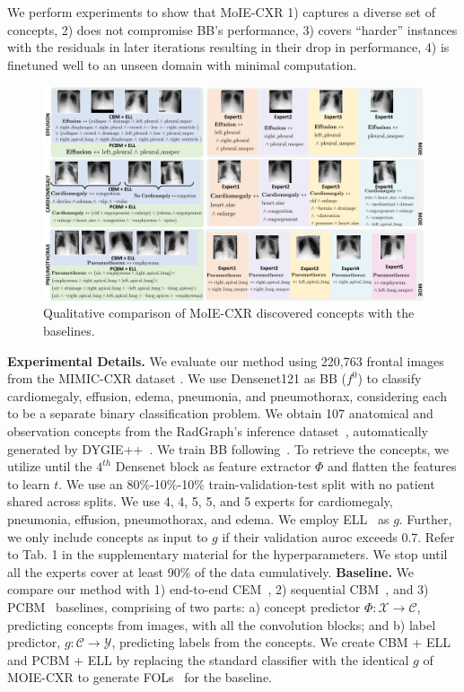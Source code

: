 We perform experiments to show that MoIE-CXR 1) captures a diverse set of concepts, 2) does not compromise BB's performance, 3) covers ``harder'' instances with the residuals in later iterations resulting in their drop in performance, 4) is finetuned well to an unseen domain with minimal computation. 

\begin{figure}[ht]
\begin{center}
\includegraphics[width=\linewidth]{plots/main/Qual_main_up.pdf}
\caption{Qualitative comparison of MoIE-CXR discovered concepts with the baselines.}
\label{fig:qual}
\end{center}
\end{figure}

\noindent \textbf{Experimental Details.} We evaluate our method using  220,763 frontal images from the MIMIC-CXR dataset \cite{12_johnsonmimic}. We use Densenet121 \cite{huang2017densely} as BB ($f^0$) to classify cardiomegaly, effusion, edema, pneumonia, and pneumothorax, considering each to be a separate binary classification problem. We obtain 107 anatomical and observation concepts from the RadGraph’s inference dataset~\cite{10_jain2021radgraph}, automatically generated by DYGIE++~\cite{23_wadden-etal-2019-entity}. We train BB following~\cite{yu2022anatomy}. To retrieve the concepts, we utilize until the $4^{th}$ Densenet block as feature extractor $\Phi$ and flatten the features to learn $t$. We use an 80\%-10\%-10\% train-validation-test split with no patient shared across splits. We use 4, 4, 5, 5, and 5 experts for cardiomegaly, pneumonia, effusion, pneumothorax, and edema. We employ ELL~\cite{barbiero2022entropy} as $g$. Further, we only include concepts as
input to $g$ if their validation auroc exceeds 0.7. Refer to Tab. 1 in the supplementary material for the hyperparameters. 
We stop until all the experts cover at least 90\% of the data cumulatively. \noindent \textbf{Baseline.} We compare our method with 1) end-to-end CEM~\cite{zarlenga2022concept}, 2) sequential CBM~\cite{koh2020concept}, and 3) PCBM~\cite{yuksekgonul2022post} baselines, comprising of two parts: a) concept predictor $\Phi: \mathcal{X} \rightarrow \mathcal{C}$, predicting concepts from images, with all the convolution blocks; and b) label predictor, $g: \mathcal{C} \rightarrow \mathcal{Y}$, predicting labels from the concepts. We create CBM + ELL and PCBM + ELL by replacing the standard classifier with the identical $g$ of MOIE-CXR to generate FOLs~\cite{barbiero2022entropy} for the baseline.